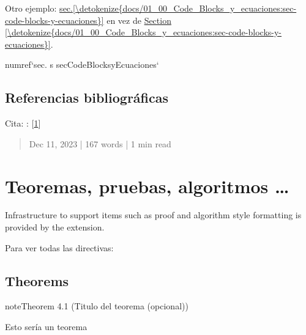 \documentclass[letterpaper,10pt,english]{jupyterBook}
\begin{document}
\sphinxAtStartPar
Otro ejemplo: \hyperref[\detokenize{docs/01_00_Code_Blocks_y_ecuaciones:sec-code-blocks-y-ecuaciones}]{sec.\@ \ref{\detokenize{docs/01_00_Code_Blocks_y_ecuaciones:sec-code-blocks-y-ecuaciones}}} en vez de \hyperref[\detokenize{docs/01_00_Code_Blocks_y_ecuaciones:sec-code-blocks-y-ecuaciones}]{Section \ref{\detokenize{docs/01_00_Code_Blocks_y_ecuaciones:sec-code-blocks-y-ecuaciones}}}.

\begin{sphinxVerbatim}[commandchars=\\\{\}]
\PYGZob{}numref\PYGZcb{}`sec. \PYGZpc{}s \PYGZlt{}sec\PYGZus{}Code\PYGZus{}Blocks\PYGZus{}y\PYGZus{}Ecuaciones\PYGZgt{}`
\end{sphinxVerbatim}


\section{Referencias bibliográficas}
\label{\detokenize{docs/03_00_referenciar_cosas:referencias-bibliograficas}}
\sphinxAtStartPar
Cita: : {[}\hyperlink{cite.docs/03_00_referenciar_cosas:id3}{1}{]}

\sphinxstepscope
\begin{quote}

\sphinxAtStartPar
Dec 11, 2023 | 167 words | 1 min read
\end{quote}


\chapter{Teoremas, pruebas, algoritmos …}
\label{\detokenize{docs/04_00_Teoremas_pruebas_y_algoritmos:teoremas-pruebas-algoritmos}}\label{\detokenize{docs/04_00_Teoremas_pruebas_y_algoritmos::doc}}
\sphinxAtStartPar
Infrastructure to support items such as proof and algorithm style formatting is provided by the  extension.

\sphinxAtStartPar
Para ver todas las directivas: 


\section{Theorems}
\label{\detokenize{docs/04_00_Teoremas_pruebas_y_algoritmos:theorems}}\label{docs/04_00_Teoremas_pruebas_y_algoritmos:my-theorem}
\begin{sphinxadmonition}{note}{Theorem 4.1 (Titulo del teorema (opcional))}



\sphinxAtStartPar
Esto sería un teorema
\end{sphinxadmonition}
\end{document}
